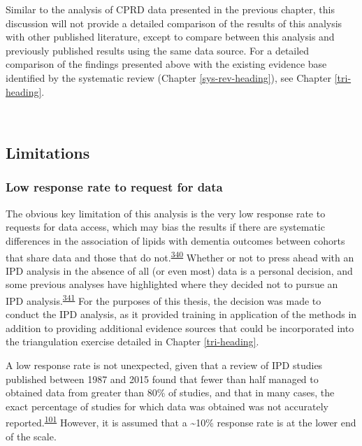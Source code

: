 \documentclass[a4paper, twoside]{templates/ociamthesis}
\begin{document}
Similar to the analysis of CPRD data presented in the previous chapter, this discussion will not provide a detailed comparison of the results of this analysis with other published literature, except to compare between this analysis and previously published results using the same data source. For a detailed comparison of the findings presented above with the existing evidence base identified by the systematic review (Chapter \ref{sys-rev-heading}), see Chapter \ref{tri-heading}.

~

\hypertarget{limitations-1}{%
\subsection{Limitations}\label{limitations-1}}

\hypertarget{low-response-rate-to-request-for-data}{%
\subsubsection{Low response rate to request for data}\label{low-response-rate-to-request-for-data}}

The obvious key limitation of this analysis is the very low response rate to requests for data access, which may bias the results if there are systematic differences in the association of lipids with dementia outcomes between cohorts that share data and those that do not.\textsuperscript{\protect\hyperlink{ref-ahmed2012}{340}} Whether or not to press ahead with an IPD analysis in the absence of all (or even most) data is a personal decision, and some previous analyses have highlighted where they decided not to pursue an IPD analysis.\textsuperscript{\protect\hyperlink{ref-jaspers2014}{341}} For the purposes of this thesis, the decision was made to conduct the IPD analysis, as it provided training in application of the methods in addition to providing additional evidence sources that could be incorporated into the triangulation exercise detailed in Chapter \ref{tri-heading}.

A low response rate is not unexpected, given that a review of IPD studies published between 1987 and 2015 found that fewer than half managed to obtained data from greater than 80\% of studies, and that in many cases, the exact percentage of studies for which data was obtained was not accurately reported.\textsuperscript{\protect\hyperlink{ref-nevitt2017}{101}} However, it is assumed that a \textasciitilde10\% response rate is at the lower end of the scale.
\end{document}
